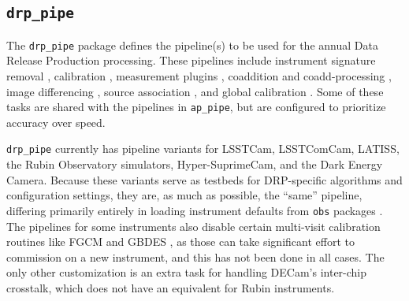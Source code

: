 \subsection{\texttt{drp\_pipe}}
\label{sec:drp_pipe}

The \texttt{drp\_pipe} package defines the pipeline(s) to be used for the annual Data Release Production processing.
These pipelines include instrument signature removal , calibration , measurement plugins , coaddition and coadd-processing , image differencing , source association , and global calibration .
Some of these tasks are shared with the pipelines in \texttt{ap\_pipe}, but are configured to prioritize accuracy over speed.

\texttt{drp\_pipe} currently has pipeline variants for LSSTCam, LSSTComCam, LATISS, the Rubin Observatory simulators, Hyper-SuprimeCam, and the Dark Energy Camera.
Because these variants serve as testbeds for DRP-specific algorithms and configuration settings, they are, as much as possible, the ``same'' pipeline, differing primarily entirely in loading instrument defaults from \texttt{obs} packages .
The pipelines for some instruments also disable certain multi-visit calibration routines like FGCM  and GBDES , as those can take significant effort to commission on a new instrument, and this has not been done in all cases.
The only other customization is an extra task for handling DECam's inter-chip crosstalk, which does not have an equivalent for Rubin instruments.

